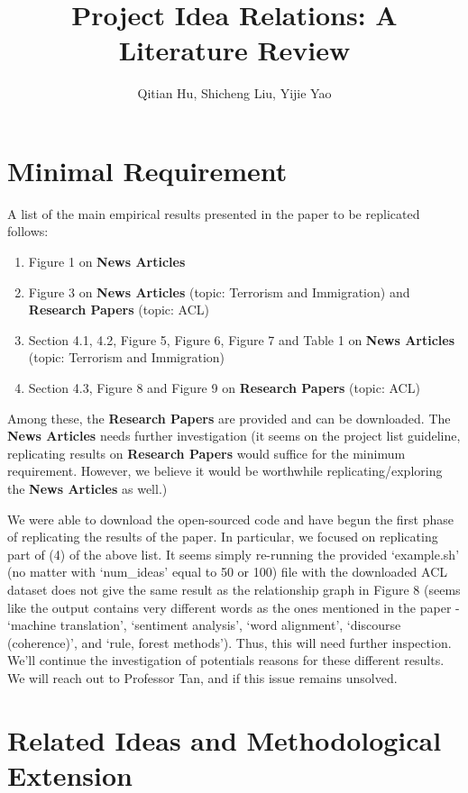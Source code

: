 \documentclass{article}
\title{ Project Idea Relations: A Literature Review }
\author{Qitian Hu, Shicheng Liu, Yijie Yao}
\begin{document}
\maketitle 

\section{Minimal Requirement}

A list of the main empirical results presented in the paper to be replicated
\cite{original} follows:

\begin{enumerate}
  \item Figure 1 on \textbf{News Articles}
  \item Figure 3 on \textbf{News Articles} (topic: Terrorism and Immigration)
   and \textbf{Research Papers} (topic: ACL)
  \item Section 4.1, 4.2, Figure 5, Figure 6, Figure 7 and Table 1 on 
  \textbf{News Articles} (topic: Terrorism and Immigration)
  \item Section 4.3, Figure 8 and Figure 9 on \textbf{Research Papers} 
  (topic: ACL)
\end{enumerate}

Among these, the \textbf{Research Papers} are provided and can be downloaded. 
The \textbf{News Articles} needs further investigation (it seems on the 
project list guideline, replicating results on \textbf{Research Papers}
would suffice for the minimum requirement. However, we believe it would be
worthwhile replicating/exploring the \textbf{News Articles} as well.)

We were able to download the open-sourced code and have begun the first phase of replicating
the results of the paper. In particular, we focused on replicating part of (4)
of the above list. It seems simply re-running the provided `example.sh'
(no matter with `num\_ideas' equal to 50 or 100)
file with the downloaded ACL dataset does not give the same result as the
relationship graph in Figure 8 (seems like the output contains very different
words as the ones mentioned in the paper - `machine translation', 
`sentiment analysis', `word alignment', `discourse (coherence)', and 
`rule, forest methods'). Thus, this will need further inspection. We'll continue
the investigation of potentials reasons for these different results. We will reach out to Professor Tan, and if this issue remains unsolved.

\section{Related Ideas and Methodological Extension}
\end{document}
